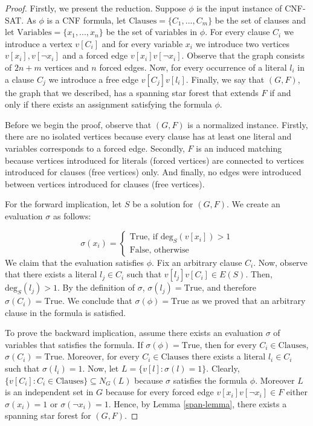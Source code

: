 \documentclass[en]{pracamgr}
\theoremstyle{definition}
\newcommand{\cnfsat}{{\sc CNF-SAT}}
\newcommand{\degree}[2]{\textrm{deg}_{#1}(#2)}
\newcommand{\true}{\textrm{True}}
\begin{document}
\begin{proof}
	Firstly, we present the reduction. Suppose $\phi$ is the input instance of \cnfsat{}. As $\phi$ is a CNF formula, let $\textrm{Clauses}=\{C_1,...,C_m\}$ be the set of clauses and let $\textrm{Variables}=\{x_1,...,x_n\}$ be the set of variables in $\phi$. For every clause $C_i$ we introduce a vertex $v[C_i]$ and for every variable $x_i$ we introduce two vertices $v[x_i],v[\neg x_i]$ and a forced edge $v[x_i]v[\neg x_i]$. Observe that the graph consists of $2n+m$ vertices and $n$ forced edges. Now, for every occurrence of a literal $l_i$ in a clause $C_j$ we introduce a free edge $v[C_j]v[l_i]$. Finally, we say that $(G,F)$, the graph that we described, has a spanning star forest that extends $F$ if and only if there exists an assignment satisfying the formula $\phi$.
	
	Before we begin the proof, observe that $(G,F)$ is a normalized instance. Firstly, there are no isolated vertices because every clause has at least one literal and variables corresponds to a forced edge. Secondly, $F$ is an induced matching because vertices introduced for literals (forced vertices) are connected to vertices introduced for clauses (free vertices) only. And finally, no edges were introduced between vertices introduced for clauses (free vertices).
	
	For the forward implication, let $S$ be a solution for $(G,F)$. We create an evaluation $\sigma$ as follows:
	
	\begin{equation*}
		\sigma(x_i) = 
		\begin{cases}
			\textrm{True}\text{, if $\degree{S}{v[x_i]} > 1$} \\
			\textrm{False}\text{, otherwise}
		\end{cases}
	\end{equation*}
	We claim that the evaluation satisfies $\phi$. Fix an arbitrary clause $C_i$. Now, observe that there exists a literal $l_j \in C_i$ such that $v[l_j]v[C_i] \in E(S)$. Then, $\degree{S}{l_j}>1$. By the definition of $\sigma$, $\sigma(l_j)=\true$, and therefore $\sigma(C_i)=\true$. We conclude that $\sigma(\phi)=\true$ as we proved that an arbitrary clause in the formula is satisfied.
	
	To prove the backward implication, assume there exists an evaluation $\sigma$ of variables that satisfies the formula. If $\sigma(\phi)=\textrm{True}$, then for every $C_i \in \textrm{Clauses}$, $\sigma(C_i)=\textrm{True}$. Moreover, for every $C_i \in \textrm{Clauses}$ there exists a literal $l_i \in C_i$ such that $\sigma(l_i)=1$. Now, let $L = \{v[l]: \sigma(l)=1\}$. Clearly, $\{v[C_i]: C_i \in \textrm{Clauses}\} \subseteq N_G(L)$ because $\sigma$ satisfies the formula $\phi$. Moreover $L$ is an independent set in $G$ because for every forced edge $v[x_i]v[\neg x_i] \in F$ either $\sigma(x_i)=1$ or $\sigma(\neg x_i)=1$. Hence, by Lemma \ref{span-lemma}, there exists a spanning star forest for $(G,F)$.
\end{proof}
\end{document}
